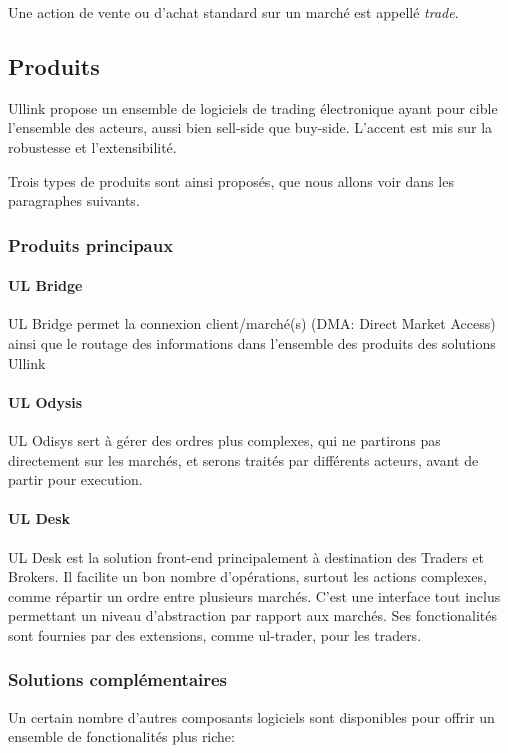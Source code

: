 \documentclass[a4paper, 12pt]{article}
\begin{document}
Une action de vente ou d'achat standard sur un marché est appellé \emph{trade}.

\subsection{Produits}

Ullink propose un ensemble de logiciels de trading électronique ayant pour cible l'ensemble des acteurs, aussi bien sell-side que buy-side. L'accent est mis sur la robustesse et l'extensibilité.

Trois types de produits sont ainsi proposés, que nous allons voir dans les paragraphes suivants.

\subsubsection{Produits principaux}

\paragraph{UL Bridge}

UL Bridge permet la connexion client/marché(s) (DMA: Direct Market Access) ainsi que le routage des informations dans l'ensemble des produits des solutions Ullink

\paragraph{UL Odysis}

UL Odisys sert à gérer des ordres plus complexes, qui ne partirons pas directement sur les marchés, et serons traités par différents acteurs, avant de partir pour execution.

\paragraph{UL Desk}
UL Desk est la solution front-end principalement à destination des Traders et Brokers. Il facilite un bon nombre d'opérations, surtout les actions complexes, comme répartir un ordre entre plusieurs marchés. C'est une interface tout inclus permettant un niveau d'abstraction par rapport aux marchés. Ses fonctionalités sont fournies par des extensions, comme ul-trader, pour les traders.

\subsubsection{Solutions complémentaires}
Un certain nombre d'autres composants logiciels sont disponibles pour offrir un ensemble de fonctionalités plus riche:
\end{document}
